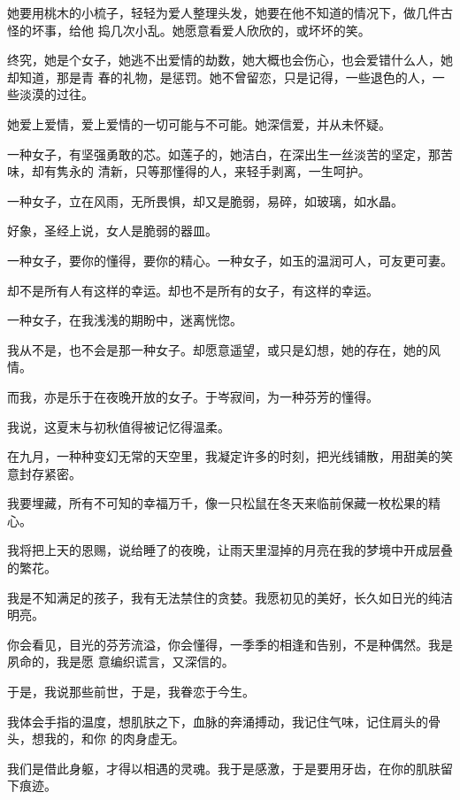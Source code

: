 \documentclass[12pt,a4paper]{article}
\def\blankrev{\vspace{1ex}}									%
\begin{document}
		她要用桃木的小梳子，轻轻为爱人整理头发，她要在他不知道的情况下，做几件古怪的坏事，给他
	捣几次小乱。她愿意看爱人欣欣的，或坏坏的笑。

		终究，她是个女子，她逃不出爱情的劫数，她大概也会伤心，也会爱错什么人，她却知道，那是青
	春的礼物，是惩罚。她不曾留恋，只是记得，一些退色的人，一些淡漠的过往。

		她爱上爱情，爱上爱情的一切可能与不可能。她深信爱，并从未怀疑。


		一种女子，有坚强勇敢的芯。如莲子的，她洁白，在深出生一丝淡苦的坚定，那苦味，却有隽永的
	清新，只等那懂得的人，来轻手剥离，一生呵护。

		一种女子，立在风雨，无所畏惧，却又是脆弱，易碎，如玻璃，如水晶。

		好象，圣经上说，女人是脆弱的器皿。

		一种女子，要你的懂得，要你的精心。一种女子，如玉的温润可人，可友更可妻。

		却不是所有人有这样的幸运。却也不是所有的女子，有这样的幸运。

		一种女子，在我浅浅的期盼中，迷离恍惚。

		我从不是，也不会是那一种女子。却愿意遥望，或只是幻想，她的存在，她的风情。

		而我，亦是乐于在夜晚开放的女子。于岑寂间，为一种芬芳的懂得。

	\endwriting



		我说，这夏末与初秋值得被记忆得温柔。


		\blankrev
		在九月，一种种变幻无常的天空里，我凝定许多的时刻，把光线铺散，用甜美的笑意封存紧密。

		我要埋藏，所有不可知的幸福万千，像一只松鼠在冬天来临前保藏一枚松果的精心。

		我将把上天的恩赐，说给睡了的夜晚，让雨天里湿掉的月亮在我的梦境中开成层叠的繁花。

		我是不知满足的孩子，我有无法禁住的贪婪。我愿初见的美好，长久如日光的纯洁明亮。


		你会看见，目光的芬芳流溢，你会懂得，一季季的相逢和告别，不是种偶然。我是夙命的，我是愿
	意编织谎言，又深信的。

		于是，我说那些前世，于是，我眷恋于今生。

		我体会手指的温度，想肌肤之下，血脉的奔涌搏动，我记住气味，记住肩头的骨头，想我的，和你
	的肉身虚无。

		我们是借此身躯，才得以相遇的灵魂。我于是感激，于是要用牙齿，在你的肌肤留下痕迹。
\end{document}
